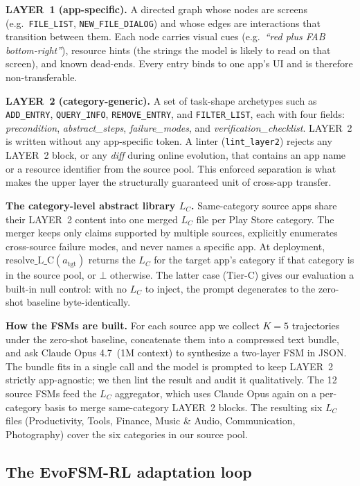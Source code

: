 \textbf{LAYER~1 (app-specific).} A directed graph whose nodes are screens (e.g.\ \texttt{FILE\_LIST}, \texttt{NEW\_FILE\_DIALOG}) and whose edges are interactions that transition between them. Each node carries visual cues (e.g.\ \emph{``red plus FAB bottom-right''}), resource hints (the strings the model is likely to read on that screen), and known dead-ends. Every entry binds to one app's UI and is therefore non-transferable.

\textbf{LAYER~2 (category-generic).} A set of task-shape archetypes such as \texttt{ADD\_ENTRY}, \texttt{QUERY\_INFO}, \texttt{REMOVE\_ENTRY}, and \texttt{FILTER\_LIST}, each with four fields: \emph{precondition}, \emph{abstract\_steps}, \emph{failure\_modes}, and \emph{verification\_checklist}. LAYER~2 is written without any app-specific token. A linter (\texttt{lint\_layer2}) rejects any LAYER~2 block, or any \emph{diff} during online evolution, that contains an app name or a resource identifier from the source pool. This enforced separation is what makes the upper layer the structurally guaranteed unit of cross-app transfer.

\textbf{The category-level abstract library $L_C$.} Same-category source apps share their LAYER~2 content into one merged $L_C$ file per Play Store category. The merger keeps only claims supported by multiple sources, explicitly enumerates cross-source failure modes, and never names a specific app. At deployment, $\mathrm{resolve\_L\_C}(a_{\text{tgt}})$ returns the $L_C$ for the target app's category if that category is in the source pool, or $\bot$ otherwise. The latter case (Tier-C) gives our evaluation a built-in null control: with no $L_C$ to inject, the prompt degenerates to the zero-shot baseline byte-identically.

\textbf{How the FSMs are built.} For each source app we collect $K{=}5$ trajectories under the zero-shot baseline, concatenate them into a compressed text bundle, and ask Claude Opus 4.7~(1M context) to synthesize a two-layer FSM in JSON. The bundle fits in a single call and the model is prompted to keep LAYER~2 strictly app-agnostic; we then lint the result and audit it qualitatively. The 12 source FSMs feed the $L_C$ aggregator, which uses Claude Opus again on a per-category basis to merge same-category LAYER~2 blocks. The resulting six $L_C$ files (Productivity, Tools, Finance, Music \& Audio, Communication, Photography) cover the six categories in our source pool.

\subsection{The EvoFSM-RL adaptation loop}
\label{sec:method-loop}

